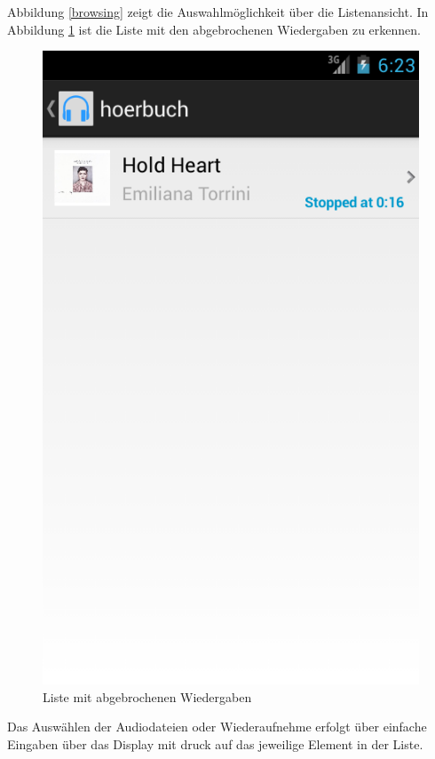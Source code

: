 Abbildung \ref{browsing} zeigt die Auswahlmöglichkeit über die Listenansicht. In Abbildung \ref{broken} ist die Liste mit den abgebrochenen Wiedergaben zu erkennen.

\begin{figure}[ht!]
\begin{center}
\includegraphics[scale=.5]{images/broken}
\caption{Liste mit abgebrochenen Wiedergaben}
\label{broken}
\end{center}
\end{figure}

Das Auswählen der Audiodateien oder Wiederaufnehme erfolgt über einfache Eingaben über das Display mit druck auf das jeweilige Element in der Liste.

